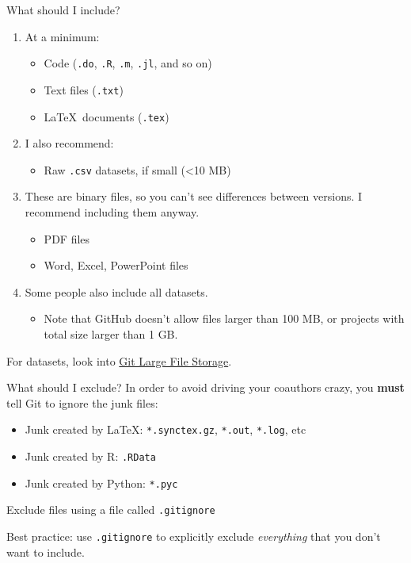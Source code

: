 \documentclass{beamer}
\begin{document}
\begin{frame}{What should I include?}
\begin{enumerate}
\item At a minimum:
\begin{itemize}
\item Code (\texttt{.do}, \texttt{.R}, \texttt{.m}, \texttt{.jl}, and so on)
\item Text files (\texttt{.txt})
\item \LaTeX \, documents (\texttt{.tex})
\end{itemize}
\item I also recommend:
\begin{itemize}
\item Raw \texttt{.csv} datasets, if small (\textless 10 MB)
\end{itemize}
\item These are binary files, so you can't see differences between versions. I recommend including them anyway.
\begin{itemize}
\item PDF files
\item Word, Excel, PowerPoint files
\end{itemize}
\item Some people also include all datasets.
\begin{itemize}
\item Note that GitHub doesn't allow files larger than 100 MB, or projects with total size larger than 1 GB.
\end{itemize}
\end{enumerate}

For datasets, look into \href{https://git-lfs.github.com/}{Git Large File Storage}.
\end{frame}

\begin{frame}{What should I exclude?}
In order to avoid driving your coauthors crazy, you \textbf{must} tell Git to ignore the junk files:
\begin{itemize}
\item Junk created by \LaTeX: \texttt{*.synctex.gz}, \texttt{*.out}, \texttt{*.log}, etc
\item Junk created by R: \texttt{.RData}
\item Junk created by Python: \texttt{*.pyc}
\end{itemize}
Exclude files using a file called \texttt{.gitignore}

Best practice: use \texttt{.gitignore} to explicitly exclude \textit{everything} that you don't want to include.
\end{frame}
\end{document}
